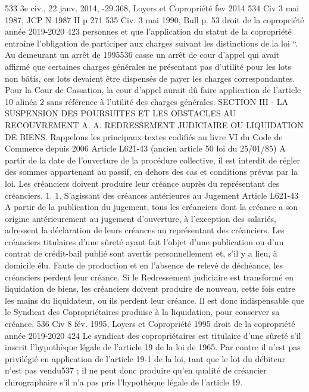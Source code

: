 533 3e civ., 22 janv. 2014, -29.368, Loyers et Copropriété fev 2014
534 Civ 3 mai 1987, JCP N 1987 II p 271
535 Civ. 3 mai 1990, Bull  p. 53
droit de la copropriété année 2019-2020
423
personnes et que l'application du statut de la copropriété entraîne l'obligation de participer aux charges suivant les distinctions de la loi “.
Au demeurant un arrêt de 1995536 casse un arrêt de cour d'appel qui avait affirmé que certaines charges générales ne présentant pas d'utilité pour les lots non bâtis, ces lots devaient être dispensés de payer les charges correspondantes. Pour la Cour de Cassation, la cour d'appel aurait dû faire application de l'article 10 alinéa 2 sans référence à l'utilité des charges générales.
SECTION III - LA SUSPENSION DES POURSUITES ET LES OBSTACLES AU RECOUVREMENT
A. A. REDRESSEMENT JUDICIAIRE OU LIQUIDATION DE BIENS.
Rappelons les principaux textes codifiés au livre VI du Code de Commerce depuis 2006
Article L621-43 (ancien article 50 loi du 25/01/85)
A partir de la date de l’ouverture de la procédure collective, il est interdit de régler des sommes appartenant au passif, en dehors des cas et conditions prévus par la loi. Les créanciers doivent produire leur créance auprès du représentant des créanciers.
1. 1. S’agissant des créances antérieures au Jugement
Article L621-43
A partir de la publication du jugement, tous les créanciers dont la créance a son origine antérieurement au jugement d'ouverture, à l'exception des salariés, adressent la déclaration de leurs créances au représentant des créanciers. Les créanciers titulaires d'une sûreté ayant fait l'objet d'une publication ou d'un contrat de crédit-bail publié sont avertis personnellement et, s'il y a lieu, à domicile élu.
Faute de production et en l’absence de relevé de déchéance, les créanciers perdent leur créance.
Si le Redressement judiciaire est transformé en liquidation de biens, les créanciers doivent produire de nouveau, cette fois entre les mains du liquidateur, ou ils perdent leur créance.
Il est donc indispensable que le Syndicat des Copropriétaires produise à la liquidation, pour conserver sa créance.
536 Civ 8 fév. 1995, Loyers et Copropriété 1995 
droit de la copropriété année 2019-2020
424
Le syndicat des copropriétaires est titulaire d’une sûreté s’il inscrit l’hypothèque légale de l’article 19 de la loi de 1965. Par contre il n’est pas privilégié en application de l’article 19-1 de la loi, tant que le lot du débiteur n’est pas vendu537 ; il ne peut donc produire qu’en qualité de créancier chirographaire s’il n’a pas pris l’hypothèque légale de l’article 19.
